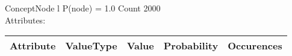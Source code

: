 
 
ConceptNode l \hspace{1cm} P(node) = 1.0 \hspace{1cm} Count 2000
\\ Attributes: \\ 
 \begin{table}[h] 
  \centering 
 \begin{longtable}{|c|c|c|c|c|} \hline 
Attribute & ValueType & Value & Probability & Occurences \\ \hline 
\end{longtable}
 \end{table} 

